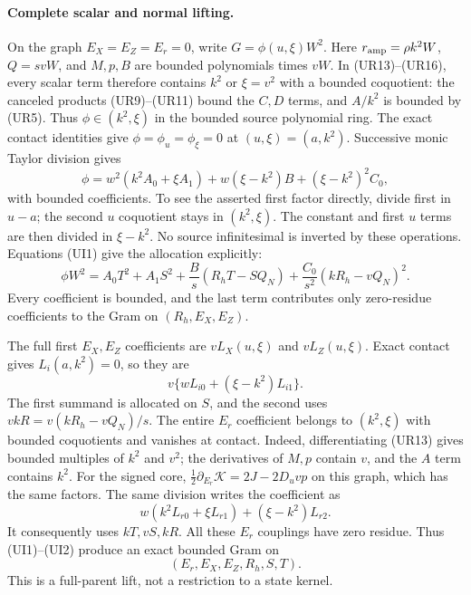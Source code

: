 \paragraph{Complete scalar and normal lifting.}
On the graph $E_X=E_Z=E_r=0$, write $G=\phi(u,\xi)W^2$.
Here $r_{\rm amp}=\rho k^2W$, $Q=svW$, and $M,p,B$ are bounded
polynomials times $vW$. In (UR13)--(UR16), every scalar term
therefore contains $k^2$ or $\xi=v^2$ with a bounded coquotient:
the canceled products (UR9)--(UR11) bound the $C,D$ terms, and
$A/k^2$ is bounded by (UR5). Thus $\phi\in(k^2,\xi)$ in the
bounded source polynomial ring. The exact contact identities give
$\phi=\phi_u=\phi_\xi=0$ at $(u,\xi)=(a,k^2)$.
Successive monic Taylor division gives
\[
 \phi=w^2(k^2A_0+\xi A_1)
             +w(\xi-k^2)B+(\xi-k^2)^2C_0,          \tag{UI2}
\]
with bounded coefficients. To see the asserted first factor directly,
divide first in $u-a$; the second $u$ coquotient stays in
$(k^2,\xi)$. The constant and first $u$ terms are then divided in
$\xi-k^2$. No source infinitesimal is inverted by these operations.
Equations (UI1) give the allocation explicitly:
\[
 \phi W^2=A_0T^2+A_1S^2
       +\frac{B}{s}(R_hT-SQ_N)
       +\frac{C_0}{s^2}(kR_h-vQ_N)^2.
\]
Every coefficient is bounded, and the last term contributes only
zero-residue coefficients to the Gram on $(R_h,E_X,E_Z)$.

The full first $E_X,E_Z$ coefficients are $vL_X(u,\xi)$ and
$vL_Z(u,\xi)$. Exact contact gives $L_i(a,k^2)=0$, so they are
\[
 v\{wL_{i0}+(\xi-k^2)L_{i1}\}.
\]
The first summand is allocated on $S$, and the second uses
$vkR=v(kR_h-vQ_N)/s$. The entire $E_r$ coefficient belongs to
$(k^2,\xi)$ with bounded coquotients and vanishes at contact.
Indeed, differentiating (UR13) gives bounded multiples of $k^2$
and $v^2$; the derivatives of $M,p$ contain $v$, and the
$A$ term contains $k^2$. For the signed core,
$\tfrac12\partial_{E_r}\mathcal K=2J-2D_uvp$ on this graph,
which has the same factors. The same division writes the coefficient as
\[
 w(k^2L_{r0}+\xi L_{r1})+(\xi-k^2)L_{r2}.
\]
It consequently uses $kT,vS,kR$. All these $E_r$ couplings have
zero residue. Thus (UI1)--(UI2) produce an exact bounded Gram on
\[
             (E_r,E_X,E_Z,R_h,S,T).                 \tag{UI3}
\]
This is a full-parent lift, not a restriction to a state kernel.


